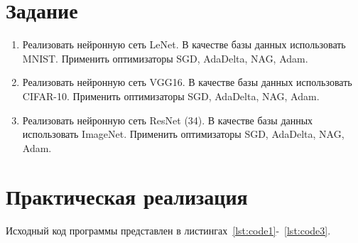 \documentclass[a4paper, 14pt]{extarticle}
\begin{document}
\renewcommand{\ttdefault}{pcr}

\setlength{\tabcolsep}{3pt}
\newpage
\setcounter{page}{2}

\section{Задание}\label{Sect::task}

\begin{enumerate}
    \item Реализовать нейронную сеть LeNet. В качестве базы данных использовать MNIST. Применить оптимизаторы SGD, AdaDelta, NAG, Adam.
    \item Реализовать нейронную сеть VGG16. В качестве базы данных использовать CIFAR-10. Применить оптимизаторы SGD, AdaDelta, NAG, Adam.
    \item Реализовать нейронную сеть ResNet (34). В качестве базы данных использовать ImageNet. Применить оптимизаторы SGD, AdaDelta, NAG, Adam.
\end{enumerate}

\section{Практическая реализация}\label{Sect::code}

Исходный код программы представлен в листингах~\ref{lst:code1}-~\ref{lst:code3}.   
\end{document}
